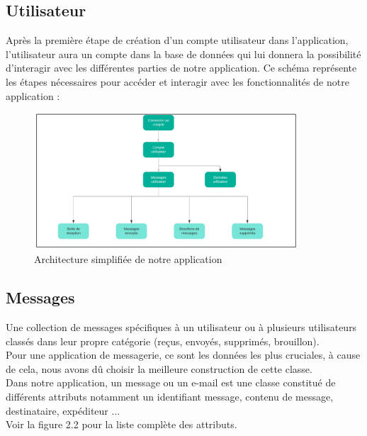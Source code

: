 \documentclass[french]{report}
\begin{document}
\begin{titlepage}
\subsection{\LARGE Utilisateur}
\LARGE Après la première étape de création d'un compte utilisateur dans l'application, l'utilisateur aura un compte dans la base de données qui lui donnera la possibilité d'interagir avec les différentes parties de notre application.
Ce schéma représente les étapes nécessaires pour accéder et interagir avec les fonctionnalités de notre application : \\
\begin{figure}[H]
    \centering
    \includegraphics[width=0.88\textwidth]{Architecture de notre application}
    \caption{Architecture simplifiée de notre application}
    \label{fig:Architecture}
\end{figure}
\subsection{\LARGE Messages}
\LARGE Une collection de messages spécifiques à un utilisateur ou à plusieurs utilisateurs classés dans leur propre catégorie (reçus, envoyés, supprimés, brouillon).\\
Pour une application de messagerie, ce sont les données les plus cruciales, à cause de cela, nous avons dû choisir la meilleure construction de cette classe.\\
Dans notre application, un message ou un e-mail est une classe constitué de différents attributs notamment un identifiant message, contenu de message, destinataire, expéditeur ...\\
Voir la figure 2.2 pour la liste complète des attributs.\\

\end{titlepage}
\end{document}
